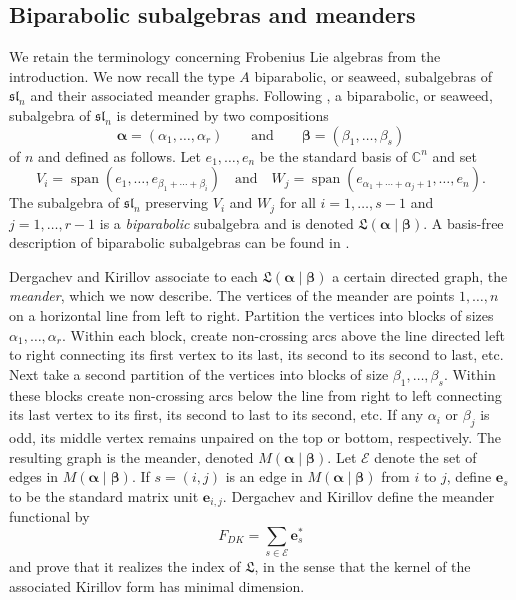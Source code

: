 \documentclass{amsart}
\newcommand{\demph}[1]{\textcolor{myblue}{\emph{#1}}}
\renewcommand{\demph}[1]{\emph{#1}}
\def\be{\mathbf{e}}
\def\cE{\mathcal E} %
\def\CC{\mathbb C}
\def\sl{\mathfrak{sl}}
\def\L{\mathfrak L}
\def\valpha{\boldsymbol{\alpha}}
\def\vbeta{\boldsymbol{\beta}}
\def\sln{\sl_n}
\theoremstyle{definition}
\begin{document}
\subsection{Biparabolic subalgebras and meanders}
\label{subsec:biparabolic-meanders}
We retain the terminology concerning Frobenius Lie algebras from the introduction. We now recall the type $A$ biparabolic, or seaweed, subalgebras of $\sln$ and
their associated meander graphs. Following 
\cite[Definition 4.1]{dergachev2000index}, a biparabolic, or seaweed,
subalgebra of $\sln$ is determined by two compositions
\[
\valpha=(\alpha_1,\ldots,\alpha_r)
\qquad\text{and}\qquad
\vbeta=(\beta_1,\ldots,\beta_s)
\]
of $n$ and defined as follows. Let $e_1,\ldots, e_n$ be the standard basis of $\CC^n$ and set
\[V_i = \operatorname{span} (e_1,\ldots,e_{\beta_1+\cdots+\beta_i}) \quad \text{and}\quad W_j=\operatorname{span}
(e_{\alpha_1+\cdots+\alpha_j+1},\ldots,e_n).
\]
The subalgebra of $\sln$ preserving $V_i$ and $W_j$ for all $i=1,\ldots, s-1$ and $j=1,\ldots, r-1$ is a \demph{biparabolic} subalgebra and is denoted $\L(\valpha\mid\vbeta)$. A basis-free description of biparabolic subalgebras can be found in \cite{panyushev2001inductive}.

Dergachev and Kirillov associate to each $\L(\valpha\mid\vbeta)$ a certain directed graph, the \demph{meander}, which we now describe. The vertices of the meander are points $1,\ldots, n$ on a horizontal line from left to right. Partition the vertices into  blocks of sizes $\alpha_1,\ldots, \alpha_r$. Within each block, create non-crossing arcs above the line directed left to right connecting its first vertex to its last, its second to its second to last, etc. Next take a second partition of the vertices into blocks of size $\beta_1,\ldots, \beta_s$. Within these blocks create non-crossing arcs below the line from right to left connecting its last vertex to its first, its second to last to its second, etc. If any $\alpha_i$ or $\beta_j$ is odd, its middle vertex remains unpaired on the top or bottom, respectively. The resulting graph is the meander, denoted $M(\valpha\mid\vbeta)$. Let $\cE$ denote the set of edges in $M(\valpha\mid\vbeta)$. If $s=(i,j)$ is an edge in $M(\valpha\mid\vbeta)$ from $i$ to $j$, define $\be_s$ to be the standard matrix unit $\be_{i,j}$. Dergachev and Kirillov define the meander functional by
\[
F_{DK}
=
\sum_{s\in\cE}\be_s^*
\]
and prove that it realizes the index of $\L$, in the sense that the kernel
of the associated Kirillov form has minimal dimension.
\end{document}
